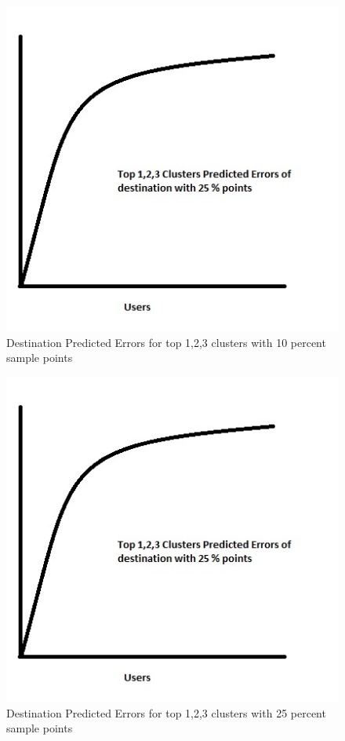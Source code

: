 \begin{figure}[H]
\centering   
\includegraphics[scale=0.4]{figs/nextloc_10.jpg}
\caption{Destination Predicted Errors for top 1,2,3 clusters with 10 percent sample points}
\label{fig:next_loc_10}  
\end{figure} 
\begin{figure}
\centering     
\includegraphics[scale=0.4]{figs/nextloc_25.jpg}
\caption{Destination Predicted Errors for top 1,2,3 clusters with 25 percent sample points}
\label{fig:next_loc_25}  
\end{figure} 

